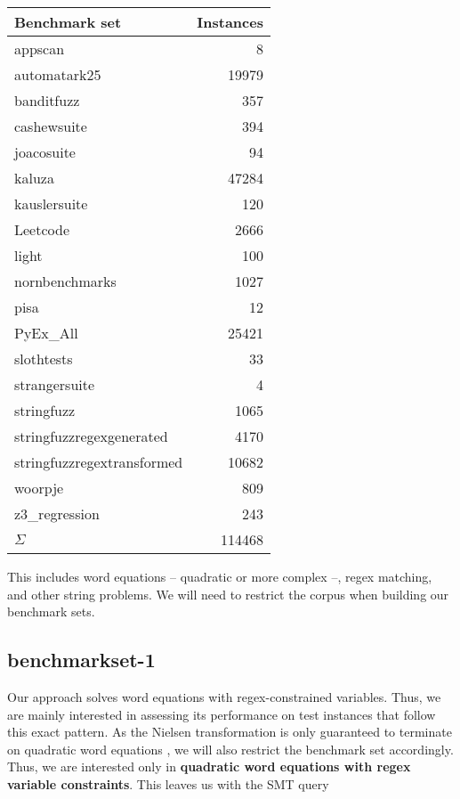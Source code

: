 \begin{center}
\begin{tabular}{|l|r|}
\hline
Benchmark set & Instances \\
\hline
appscan \cite{benchmarkset-appscan-pisa} & 8 \\
automatark25 \cite{benchmarkset-automatark-stringfuzzregex} & 19979 \\
banditfuzz \cite{benchmarkset-banditfuzz} & 357 \\
cashewsuite \cite{benchmarkset-cashew} & 394 \\
joacosuite \cite{benchmarkset-joaco-stranger} & 94 \\
kaluza \cite{benchmarkset-kaluza} & 47284 \\
kauslersuite \cite{benchmarkset-kausler} & 120 \\
Leetcode \cite{benchmarkset-leetcode} & 2666 \\
light \cite{benchmarkset-light} & 100 \\
nornbenchmarks \cite{benchmarkset-norn} & 1027 \\
pisa \cite{benchmarkset-appscan-pisa} & 12 \\
PyEx\_All \cite{benchmarkset-pyex} & 25421 \\
slothtests \cite{benchmarkset-sloth} & 33 \\
strangersuite \cite{benchmarkset-joaco-stranger} & 4 \\
stringfuzz \cite{benchmarkset-stringfuzz} & 1065 \\
stringfuzzregexgenerated \cite{benchmarkset-automatark-stringfuzzregex} & 4170 \\
stringfuzzregextransformed \cite{benchmarkset-automatark-stringfuzzregex} & 10682 \\
woorpje \cite{woorpje} & 809 \\
z3\_regression \cite{benchmarkset-z3_regression} & 243 \\
\hline
$\Sigma$ & 114468 \\
\hline
\end{tabular}
\end{center}

This includes word equations -- quadratic or more complex --, regex matching, and other string problems. We will need to restrict the corpus when building our benchmark sets.

\subsection{benchmarkset-1}
Our approach solves word equations with regex-constrained variables. Thus, we are mainly interested in assessing its performance on test instances that follow this exact pattern. As the Nielsen transformation is only guaranteed to terminate on quadratic word equations \cite{manea-nielsen}, we will also restrict the benchmark set accordingly. Thus, we are interested only in \textbf{quadratic word equations with regex variable constraints}.
This leaves us with the SMT query

